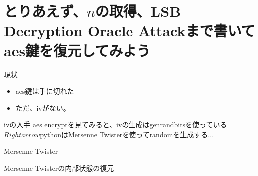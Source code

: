 \documentclass[dvipdfmx]{beamer}
\begin{document}
\section{とりあえず、$n$の取得、LSB Decryption Oracle Attackまで書いてaes鍵を復元してみよう}

\begin{frame}{現状}
  \begin{itemize}
  \item aes鍵は手に切れた
  \item ただ、ivがない。
  \end{itemize}
\end{frame}

\begin{frame}{ivの入手}
  aes encryptを見てみると、ivの生成はgenrandbitsを使っている
  $Rightarrow$pythonはMersenne Twisterを使ってrandomを生成する...
\end{frame}

\begin{frame}{Mersenne Twister}
\end{frame}

\begin{frame}{Mersenne Twisterの内部状態の復元}
\end{frame}
\end{document}

